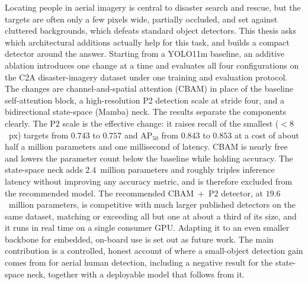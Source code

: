 
Locating people in aerial imagery is central to disaster search and rescue, but
the targets are often only a few pixels wide, partially occluded, and set against
cluttered backgrounds, which defeats standard object detectors. This thesis asks
which architectural additions actually help for this task, and builds a compact
detector around the answer. Starting from a YOLO11m baseline, an additive ablation
introduces one change at a time and evaluates all four configurations on the C2A
disaster-imagery dataset under one training and evaluation protocol. The changes
are channel-and-spatial attention (CBAM) in place of the baseline self-attention
block, a high-resolution P2 detection scale at stride four, and a bidirectional
state-space (Mamba) neck. The results separate the components clearly. The P2 scale is
the effective change: it raises recall of the smallest ($<8$~px) targets from
$0.743$ to $0.757$ and $\mathrm{AP}_{50}$ from $0.843$ to $0.853$ at a cost of about
half a million parameters and one millisecond of latency. CBAM is nearly free and
lowers the parameter count below the baseline while holding accuracy. The
state-space neck adds $2.4$~million parameters and roughly triples inference latency
without improving any accuracy metric, and is therefore excluded from the
recommended model. The recommended CBAM~+~P2 detector, at $19.6$~million parameters,
is competitive with much larger published detectors on the same dataset, matching or
exceeding all but one at about a third of its size, and it runs in real time on a
single consumer GPU. Adapting it to an even smaller backbone for embedded, on-board
use is set out as future work. The main contribution is a controlled, honest account of where
a small-object detection gain comes from for aerial human detection, including a
negative result for the state-space neck, together with a deployable model that
follows from it.
